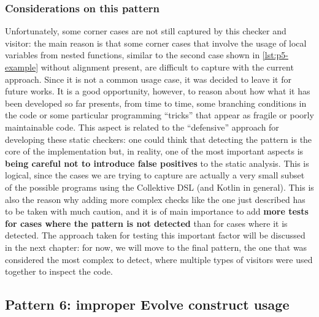 \documentclass[12pt,a4paper,openright,twoside]{book}
\begin{document}
\subsubsection{Considerations on this pattern}

Unfortunately, some corner cases are not still captured by this checker and
visitor: the main reason is that some corner cases that involve the usage of
local variables from nested functions, similar to the second case shown in
\cref{lst:p5-example} without alignment present, are difficult to capture with
the current approach. Since it is not a common usage case, it was decided to
leave it for future works. It is a good opportunity, however, to reason about
how what it has been developed so far presents, from time to time, some
branching conditions in the code or some particular programming ``tricks'' that
appear as fragile or poorly maintainable code. 
%
This aspect is related to the ``defensive'' approach for developing these static
checkers: one could think that detecting the pattern is the core of the
implementation but, in reality, one of the most important aspects is
\textbf{being careful not to introduce false positives} to the static analysis.
%
This is logical, since the cases we are trying to capture are actually a very
small subset of the possible programs using the Collektive DSL (and Kotlin in
general). This is also the reason why adding more complex checks like the one
just described has to be taken with much caution, and it is of main importance
to add \textbf{more tests for cases where the pattern is not detected} than for
cases where it is detected.
%
The approach taken for testing this important factor will be discussed in the
next chapter: for now, we will move to the final pattern, the one that was
considered the most complex to detect, where multiple types of visitors were
used together to inspect the code.


 
\subsection{Pattern 6: improper Evolve construct usage}
\end{document}
